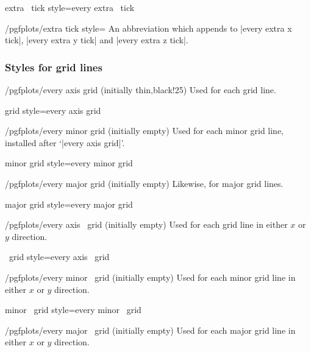 \pgfplotsshortxystylekey extra \x\ tick style=every extra \x\ tick\pgfeov

\begin{stylekey}{/pgfplots/extra tick style=}
	An abbreviation which appends  to |every extra x tick|, |every extra y tick| and |every extra z tick|.
\end{stylekey}



\subsubsection*{Styles for grid lines}

\begin{stylekey}{/pgfplots/every axis grid (initially thin,black!25)}
 Used for each grid line.
\end{stylekey}

\pgfplotsshortstylekey grid style=every axis grid\pgfeov

\begin{stylekey}{/pgfplots/every minor grid (initially empty)}
 Used for each minor grid line, installed after `|every axis grid|'.
\end{stylekey}

\pgfplotsshortstylekey minor grid style=every minor grid\pgfeov

\begin{stylekey}{/pgfplots/every major grid (initially empty)}
 Likewise, for major grid lines.
\end{stylekey}

\pgfplotsshortstylekey major grid style=every major grid\pgfeov

\begin{xystylekey}{/pgfplots/every axis \x\ grid (initially empty)}
	Used for each grid line in either $x$ or $y$ direction.
\end{xystylekey}

\pgfplotsshortxystylekey \x\ grid style=every axis \x\ grid\pgfeov

\begin{xystylekey}{/pgfplots/every minor \x\ grid (initially empty)}
	Used for each minor grid line in either $x$ or $y$ direction.
\end{xystylekey}

\pgfplotsshortxystylekey minor \x\ grid style=every minor \x\ grid\pgfeov

\begin{xystylekey}{/pgfplots/every major \x\ grid (initially empty)}
	Used for each major grid line in either $x$ or $y$ direction.
\end{xystylekey}

